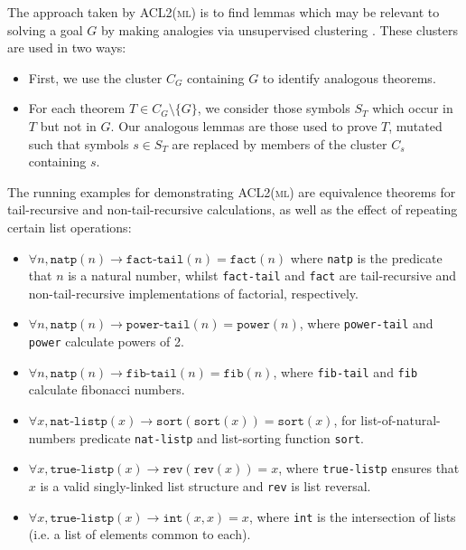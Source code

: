 \documentclass[]{article}
\begin{document}
The approach taken by \textsc{ACL2(ml)} is to find lemmas which may be relevant to solving a goal $G$ by making analogies via unsupervised clustering \cite{Heras.Komendantskaya.Johansson.ea:2013}. These clusters are used in two ways:

\begin{itemize}

  \item First, we use the cluster $C_G$ containing $G$ to identify analogous theorems.

  \item For each theorem $T \in C_G \setminus \{G\}$, we consider those symbols $S_T$ which occur in $T$ but not in $G$. Our analogous lemmas are those used to prove $T$, mutated such that symbols $s \in S_T$ are replaced by members of the cluster $C_s$ containing $s$.

\end{itemize}

The running examples for demonstrating \textsc{ACL2(ml)} are equivalence theorems for tail-recursive and non-tail-recursive calculations, as well as the effect of repeating certain list operations:

\begin{itemize}

  \item $\forall n, \texttt{natp}(n) \rightarrow \texttt{fact-tail}(n) = \texttt{fact}(n)$ where \texttt{natp} is the predicate that $n$ is a natural number, whilst \texttt{fact-tail} and \texttt{fact} are tail-recursive and non-tail-recursive implementations of factorial, respectively.

  \item $\forall n, \texttt{natp}(n) \rightarrow \texttt{power-tail}(n) = \texttt{power}(n)$,  where \texttt{power-tail} and \texttt{power} calculate powers of 2.

  \item $\forall n, \texttt{natp}(n) \rightarrow \texttt{fib-tail}(n) = \texttt{fib}(n)$,  where \texttt{fib-tail} and \texttt{fib} calculate fibonacci numbers.

  \item $\forall x, \texttt{nat-listp}(x) \rightarrow \texttt{sort}(\texttt{sort}(x)) = \texttt{sort}(x)$, for list-of-natural-numbers predicate \texttt{nat-listp} and list-sorting function \texttt{sort}.

  \item $\forall x, \texttt{true-listp}(x) \rightarrow \texttt{rev}(\texttt{rev}(x)) = x$, where \texttt{true-listp} ensures that $x$ is a valid singly-linked list structure and \texttt{rev} is list reversal.

  \item $\forall x, \texttt{true-listp}(x) \rightarrow \texttt{int}(x, x) = x$, where \texttt{int} is the intersection of lists (i.e. a list of elements common to each).

\end{itemize}
\end{document}
